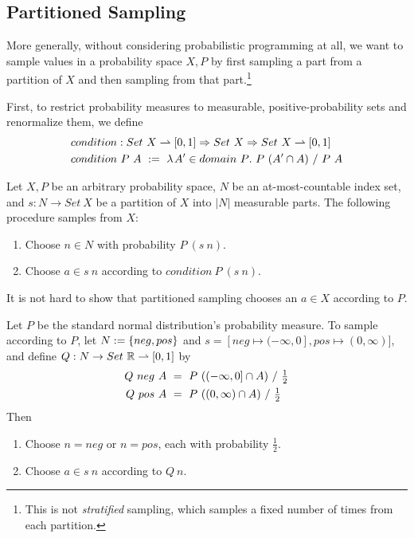\subsection{Partitioned Sampling}

More generally, without considering probabilistic programming at all, we want to sample values in a probability space $X,P$ by first sampling a part from a partition of $X$ and then sampling from that part.\footnote{This is not \emph{stratified} sampling, which samples a fixed number of times from each partition.}

First, to restrict probability measures to measurable, positive-probability sets and renormalize them, we define
\begin{equation}
\begin{aligned}
	&condition : Set~X \rightharpoonup [0,1] \Rightarrow Set~X \Rightarrow Set~X \rightharpoonup [0,1] \\
	&condition~P~A\ :=\ \lambda\mspace{2mu}{A' \in domain~P}\ldotp\, P~(A' \cap A)~{/}~P~A
\end{aligned}
\end{equation}

\begin{definition}
\label{def:partitioned-sampling}
Let $X,P$ be an arbitrary probability space, $N$ be an at-most-countable index set, and $s : N \to Set~X$ be a partition of $X$ into $|N|$ measurable parts. The following procedure samples from $X$:
\begin{enumerate}
	\item Choose $n \in N$ with probability $P~(s~n)$.
	\item Choose $a \in s~n$ according to $condition~P~(s~n)$.
\end{enumerate}
\end{definition}

It is not hard to show that partitioned sampling chooses an $a \in X$ according to $P$.

\begin{example}
\label{ex:partitioned-sampling}
Let $P$ be the standard normal distribution's probability measure.
To sample according to $P$, let $N := \{{neg,pos}\}$ and $s = [neg \mapsto (-\infty,0], pos \mapsto (0,\infty)]$, and define $Q : N \to Set~\mathbb{R} \rightharpoonup [0,1]$ by
\begin{equation}
\begin{aligned}
	Q~neg~A\ &=\ P~((-\infty,0] \cap A)~{/}~\tfrac{1}{2} \\
	Q~pos~A\ &=\ P~((0,\infty) \cap A)~{/}~\tfrac{1}{2}
\end{aligned}
\end{equation}
Then
\begin{enumerate}
	\item Choose $n = neg$ or $n = pos$, each with probability $\frac{1}{2}$.
	\item Choose $a \in s~n$ according to $Q~n$.\exampleqed
\end{enumerate}
\end{example}

